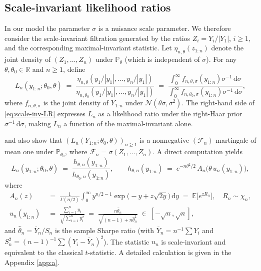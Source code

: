\documentclass[12pt, a4paper]{report}
\newcommand{\E}{\mathbb{E}}
\newcommand{\Prob}{\mathbb{P}}
\newcommand{\dd}{\,\mathrm{d}}
\newcommand{\1}{\mathbf{1}}
\begin{document}
\subsection{Scale-invariant likelihood ratios}\label{ssec:scale-inv}

In our model the parameter \(\sigma\) is a nuisance scale parameter.
We therefore consider the scale-invariant filtration generated by the
ratios \(Z_i=Y_i/|Y_1|\), \(i\geq 1\), and the corresponding
maximal-invariant statistic. Let
\(\eta_{n,\theta}(z_{1:n})\) denote the joint density of
\((Z_1,\ldots,Z_n)\) under \(\Prob_\theta\) (which is independent of
\(\sigma\)). For any \(\theta,\theta_0\in\mathbb{R}\) and \(n\geq 1\), define
\begin{equation}\label{eq:scale-inv-LR}
  L_n(y_{1:n};\theta_0,\theta)
  \;=\;\frac{\eta_{n,\theta}(y_1/|y_1|,\ldots,y_n/|y_1|)}
            {\eta_{n,\theta_0}(y_1/|y_1|,\ldots,y_n/|y_1|)}
  \;=\;\frac{\int_0^\infty f_{n,\theta,\sigma}(y_{1:n})\sigma^{-1}\dd\sigma}
            {\int_0^\infty f_{n,\theta_0,\sigma}(y_{1:n})\sigma^{-1}\dd\sigma},
\end{equation}
where \(f_{n,\theta,\sigma}\) is the joint density of \(Y_{1:n}\)
under \(\mathcal N(\theta\sigma,\sigma^2)\). The right-hand side of
\eqref{eq:scale-inv-LR} expresses \(L_n\) as a likelihood ratio under
the right-Haar prior \(\sigma^{-1}\dd\sigma\), making \(L_n\) a
function of the maximal-invariant alone.

\cite{Wang2025} and also
\cite{PerezOrtiz2024} show that
\((L_n(Y_{1:n};\theta_0,\theta))_{n\geq 1}\) is a nonnegative
\((\mathcal F_n)\)-martingale of mean one under
\(\Prob_{\theta_0}\), where \(\mathcal F_n=\sigma(Z_1,\ldots,Z_n)\). A
direct computation \cite[Sec.~4.4]{Wang2025} yields
\begin{equation}\label{eq:hthetadef}
  L_n(y_{1:n};\theta_0,\theta)
  \;=\;\frac{h_{\theta,n}(y_{1:n})}{h_{\theta_0,n}(y_{1:n})},
  \qquad
  h_{\theta,n}(y_{1:n}) \;=\; e^{-n\theta^2/2}\,A_n\bigl(\theta\,u_n(y_{1:n})\bigr),
\end{equation}
where
\begin{align}
  A_n(z) &\;=\;\frac{1}{\Gamma(n/2)}\int_0^\infty y^{n/2-1}
                \exp\!\bigl(-y+z\sqrt{2y}\bigr)\dd y
              \;=\; \E\bigl[e^{z R_n}\bigr],\quad R_n\sim\chi_n,
              \label{eq:Andef}\\[2pt]
  u_n(y_{1:n})
       &\;=\;\frac{\sum_{i=1}^n y_i}{\sqrt{\sum_{i=1}^n y_i^2}}
       \;=\;\frac{n\widehat\theta_n}{\sqrt{(n-1)+n\widehat\theta_n^2}}
       \;\in\;[-\sqrt n,\sqrt n],
       \label{eq:undef}
\end{align}
and \(\widehat\theta_n=\bar Y_n/S_n\) is the sample Sharpe ratio
(with \(\bar Y_n=n^{-1}\sum Y_i\) and
\(S_n^2=(n-1)^{-1}\sum(Y_i-\bar Y_n)^2\)).
The statistic \(u_n\) is scale-invariant and equivalent to the
classical \(t\)-statistic. A detailed calculation is given in the Appendix \ref{app:a}.
\end{document}

